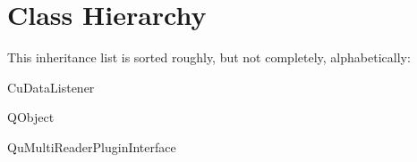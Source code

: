 \section{Class Hierarchy}
This inheritance list is sorted roughly, but not completely, alphabetically\+:\begin{DoxyCompactList}
\item Cu\+Data\+Listener\begin{DoxyCompactList}
\item {}
\end{DoxyCompactList}
\item Q\+Object\begin{DoxyCompactList}
\item {}
\end{DoxyCompactList}
\item Qu\+Multi\+Reader\+Plugin\+Interface\begin{DoxyCompactList}
\item {}
\end{DoxyCompactList}
\item {}
\end{DoxyCompactList}
